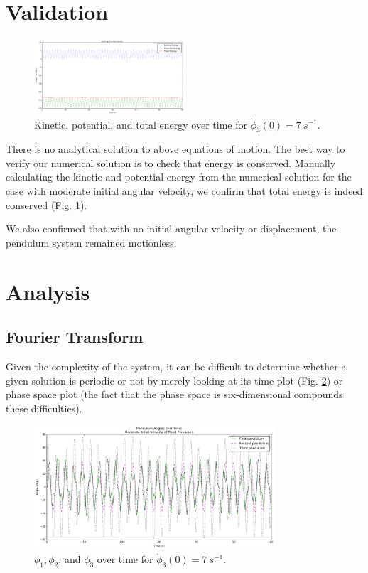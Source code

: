 \documentclass{article}
\begin{document}
\section{Validation}

\begin{figure}
	\centering
	\includegraphics[width=0.5\textwidth]{energy_conservation}
	\caption{Kinetic, potential, and total energy over time for $\dot\phi_3(0)=\SI{7}{s^{-1}}$.}
	\label{fig:energy_cons}
\end{figure}

There is no analytical solution to above equations of motion.  The best 
way to verify our numerical solution is to check that energy is conserved.
Manually calculating the kinetic and potential energy from the numerical 
solution for the case with moderate initial angular velocity, we confirm 
that total energy is indeed conserved (Fig. \ref{fig:energy_cons}).

We also confirmed that with no initial angular velocity or displacement, 
the pendulum system remained motionless.

\section{Analysis}

\subsection{Fourier Transform}
Given the complexity of the system, it can be difficult to determine whether 
a given solution is periodic or not by merely looking at its time plot 
(Fig. \ref{fig:moderate_time}) or  phase space plot (the fact that the phase 
space is six-dimensional compounds these difficulties).  

\begin{figure}[ht]
	\centering
	\includegraphics[width=0.8\textwidth]{moderate_velocity_time_sol}
	\caption{$\phi_1,\phi_2$, and $\phi_3$ over time for 
	$\dot\phi_3(0)=\SI{7}{s^{-1}}$.}
	\label{fig:moderate_time}
\end{figure}
\end{document}
